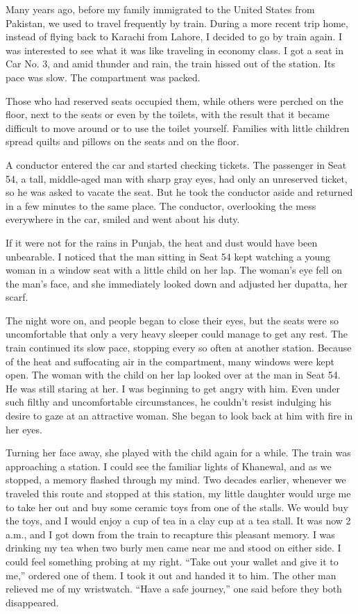 Many years ago, before my family immigrated to the United States from
Pakistan, we used to travel frequently by train. During a more recent
trip home, instead of flying back to Karachi from Lahore, I decided to
go by train again. I was interested to see what it was like traveling in
economy class. I got a seat in Car No. 3, and amid thunder and rain, the
train hissed out of the station. Its pace was slow. The compartment was
packed.

Those who had reserved seats occupied them, while others were perched on
the floor, next to the seats or even by the toilets, with the result
that it became difficult to move around or to use the toilet yourself.
Families with little children spread quilts and pillows on the seats and
on the floor.

A conductor entered the car and started checking tickets. The passenger
in Seat 54, a tall, middle-aged man with sharp gray eyes, had only an
unreserved ticket, so he was asked to vacate the seat. But he took the
conductor aside and returned in a few minutes to the same place. The
conductor, overlooking the mess everywhere in the car, smiled and went
about his duty.

If it were not for the rains in Punjab, the heat and dust would have
been unbearable. I noticed that the man sitting in Seat 54 kept watching
a young woman in a window seat with a little child on her lap. The
woman's eye fell on the man's face, and she immediately looked down and
adjusted her dupatta, her scarf.

The night wore on, and people began to close their eyes, but the seats
were so uncomfortable that only a very heavy sleeper could manage to get
any rest. The train continued its slow pace, stopping every so often at
another station. Because of the heat and suffocating air in the
compartment, many windows were kept open. The woman with the child on
her lap looked over at the man in Seat 54. He was still staring at her.
I was beginning to get angry with him. Even under such filthy and
uncomfortable circumstances, he couldn't resist indulging his desire to
gaze at an attractive woman. She began to look back at him with fire in
her eyes.

Turning her face away, she played with the child again for a while. The
train was approaching a station. I could see the familiar lights of
Khanewal, and as we stopped, a memory flashed through my mind. Two
decades earlier, whenever we traveled this route and stopped at this
station, my little daughter would urge me to take her out and buy some
ceramic toys from one of the stalls. We would buy the toys, and I would
enjoy a cup of tea in a clay cup at a tea stall. It was now 2 a.m., and
I got down from the train to recapture this pleasant memory. I was
drinking my tea when two burly men came near me and stood on either
side. I could feel something probing at my right. ``Take out your wallet
and give it to me,'' ordered one of them. I took it out and handed it to
him. The other man relieved me of my wristwatch. ``Have a safe
journey,'' one said before they both disappeared.

